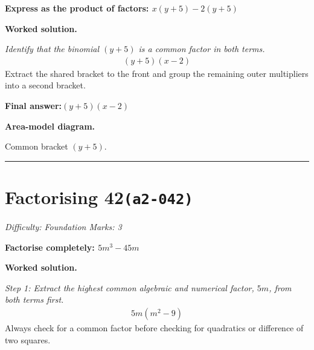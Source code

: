 \documentclass[11pt]{article}
\newcommand{\question}[1]{\par\medskip\noindent\textbf{#1}\par}
\begin{document}
\question{Express as the product of factors: \( x(y+5) - 2(y+5) \)}

\textbf{Worked solution.}

\textit{Identify that the binomial \( (y+5) \) is a common factor in both terms.}
\[\begin{gathered}
(y+5)(x - 2)
\end{gathered}\]
Extract the shared bracket to the front and group the remaining outer multipliers into a second bracket.

\begin{answerbox}
\textbf{Final answer:}\quad \(\displaystyle (y+5)(x - 2)\)
\end{answerbox}
\textbf{Area-model diagram.}

\begin{center}
\end{center}
\small Common bracket $(y+5)$.\normalsize

\medskip\hrule

\section*{Factorising 42\quad\small\texttt{(a2-042)}}
\textit{Difficulty: Foundation \quad\textbar\quad Marks: 3}

\question{Factorise completely: \( 5m^3 - 45m \)}

\textbf{Worked solution.}

\textit{Step 1: Extract the highest common algebraic and numerical factor, \( 5m \), from both terms first.}
\[\begin{gathered}
5m(m^2 - 9)
\end{gathered}\]
Always check for a common factor before checking for quadratics or difference of two squares.
\end{document}
